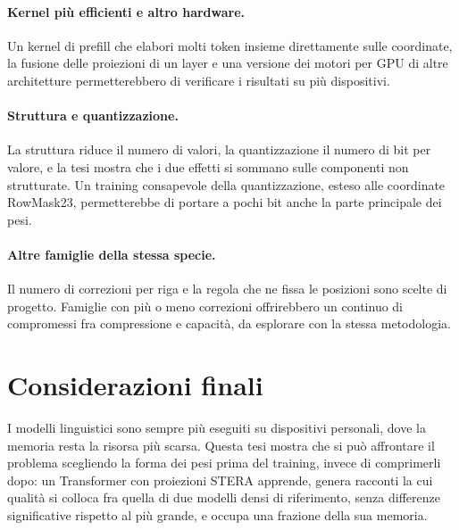 \paragraph{Kernel più efficienti e altro hardware.} Un kernel di prefill che elabori molti token insieme direttamente sulle coordinate, la fusione delle proiezioni di un layer e una versione dei motori per GPU di altre architetture permetterebbero di verificare i risultati su più dispositivi.

\paragraph{Struttura e quantizzazione.} La struttura riduce il numero di valori, la quantizzazione il numero di bit per valore, e la tesi mostra che i due effetti si sommano sulle componenti non strutturate. Un training consapevole della quantizzazione, esteso alle coordinate RowMask23, permetterebbe di portare a pochi bit anche la parte principale dei pesi.

\paragraph{Altre famiglie della stessa specie.} Il numero di correzioni per riga e la regola che ne fissa le posizioni sono scelte di progetto. Famiglie con più o meno correzioni offrirebbero un continuo di compromessi fra compressione e capacità, da esplorare con la stessa metodologia.

\section{Considerazioni finali}

I modelli linguistici sono sempre più eseguiti su dispositivi personali, dove la memoria resta la risorsa più scarsa. Questa tesi mostra che si può affrontare il problema scegliendo la forma dei pesi prima del training, invece di comprimerli dopo: un Transformer con proiezioni STERA apprende, genera racconti la cui qualità si colloca fra quella di due modelli densi di riferimento, senza differenze significative rispetto al più grande, e occupa una frazione della sua memoria.
